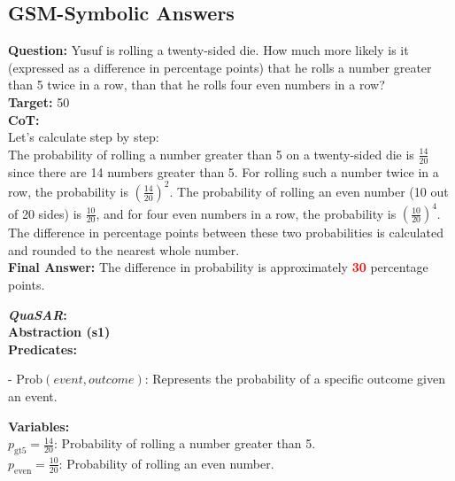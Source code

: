 \documentclass[11pt]{article}
\newcommand{\QuaSAR}{\emph{QuaSAR}\xspace}
\begin{document}
\begin{table*}[]
\section{GSM-Symbolic Answers}
\label{app:Dice_Rolling_Probabilities}
\begin{small}
\begin{tcolorbox}[colback=white, colframe=lightblue, rounded corners]

\textbf{Question:} Yusuf is rolling a twenty-sided die. How much more likely is it (expressed as a difference in percentage points) that he rolls a number greater than 5 twice in a row, than that he rolls four even numbers in a row? \\
\textbf{Target:} 50 \\

\textbf{CoT:} \\
Let's calculate step by step:\\
The probability of rolling a number greater than 5 on a twenty-sided die is \( \frac{14}{20} \) since there are 14 numbers greater than 5. For rolling such a number twice in a row, the probability is \( \left(\frac{14}{20}\right)^2 \).
The probability of rolling an even number (10 out of 20 sides) is \( \frac{10}{20} \), and for four even numbers in a row, the probability is \( \left(\frac{10}{20}\right)^4 \).
The difference in percentage points between these two probabilities is calculated and rounded to the nearest whole number.\\
\textbf{Final Answer:} The difference in probability is approximately \textcolor{red}{\textbf{30}} percentage points.


\tcblower

\textbf{\QuaSAR:} \\
\textbf{Abstraction (s1)}\\
\textbf{Predicates:}

\hspace*{0.5cm} - \( \text{Prob}(event, outcome) \): Represents the probability of a specific outcome given an event.

\textbf{Variables:}\\

\hspace*{0.5cm} \( p_{\text{gt5}} = \frac{14}{20} \): Probability of rolling a number greater than 5.\\
\hspace*{0.5cm} \( p_{\text{even}} = \frac{10}{20} \): Probability of rolling an even number.


\end{tcolorbox}
\end{small}
\end{table*}
\end{document}
